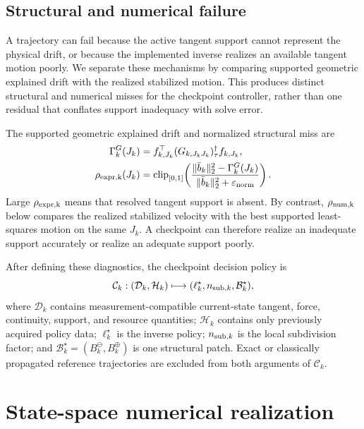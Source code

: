 \documentclass[
  reprint,
  amsmath,
  amssymb,
  aps,
  pra,
  nofootinbib,
  superscriptaddress,
  floatfix
]{revtex4-2}
\newcommand{\eps}{\varepsilon}
\begin{document}
\subsection{Structural and numerical failure}

A trajectory can fail because the active tangent support cannot represent the physical drift, or because the implemented inverse realizes an available tangent motion poorly.  We separate these mechanisms by comparing supported geometric explained drift with the realized stabilized motion.  This produces distinct structural and numerical misses for the checkpoint controller, rather than one residual that conflates support inadequacy with solve error.

The supported geometric explained drift and normalized structural miss are
\begin{equation}
\begin{aligned}
\Gamma_k^G(J_k)
&=f_{k,J_k}^{\top}(G_{k,J_kJ_k})_{\tau}^{\dagger}f_{k,J_k},\\
\rho_{\rm expr,k}(J_k)
&=\operatorname{clip}_{[0,1]}\!\left(
\frac{\|\bar b_k\|_2^2-\Gamma_k^G(J_k)}
{\|\bar b_k\|_2^2+\eps_{\rm norm}}
\right).
\end{aligned}
\label{eq:active_structural_miss}
\end{equation}
Large $\rho_{\rm expr,k}$ means that resolved tangent support is absent.  By contrast, $\rho_{\rm num,k}$ below compares the realized stabilized velocity with the best supported least-squares motion on the same $J_k$.  A checkpoint can therefore realize an inadequate support accurately or realize an adequate support poorly.

After defining these diagnostics, the checkpoint decision policy is
\begin{equation}
\mathcal C_k:(\mathcal D_k,\mathcal H_k)
\longmapsto
(\ell_k^\star,n_{{\rm sub},k},\mathcal B_k^\star),
\label{eq:checkpoint_policy_map}
\end{equation}
where $\mathcal D_k$ contains measurement-compatible current-state tangent, force, continuity, support, and resource quantities; $\mathcal H_k$ contains only previously acquired policy data; $\ell_k^\star$ is the inverse policy; $n_{{\rm sub},k}$ is the local subdivision factor; and $\mathcal B_k^\star=(B_k^\ominus,B_k^\oplus)$ is one structural patch.  Exact or classically propagated reference trajectories are excluded from both arguments of $\mathcal C_k$.

\section{State-space numerical realization}
\label{sec:numerical_solve_repair}
\end{document}
